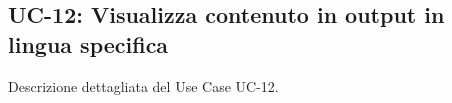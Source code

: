 \subsection{UC-12: Visualizza contenuto in output in lingua specifica}

Descrizione dettagliata del Use Case UC-12.
